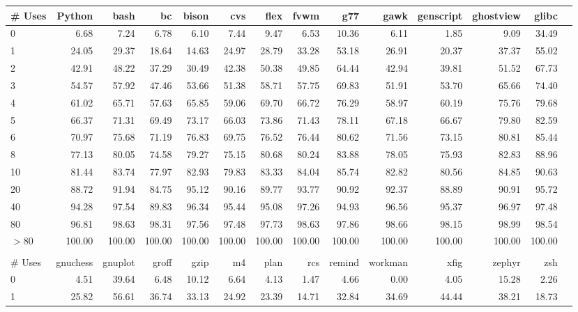 \begin{tabular}{|l|r|r|r|r|r|r|r|r|r|r|r|r|r|}\hline
\# Uses & Python & bash & bc & bison & cvs & flex & fvwm & g77 & gawk & genscript & ghostview & glibc\\\hline\hline
0 & 6.68 & 7.24 & 6.78 & 6.10 & 7.44 & 9.47 & 6.53 & 10.36 & 6.11 & 1.85 & 9.09 & 34.49\\\hline
1 & 24.05 & 29.37 & 18.64 & 14.63 & 24.97 & 28.79 & 33.28 & 53.18 & 26.91 & 20.37 & 37.37 & 55.02\\\hline
2 & 42.91 & 48.22 & 37.29 & 30.49 & 42.38 & 50.38 & 49.85 & 64.44 & 42.94 & 39.81 & 51.52 & 67.73\\\hline
3 & 54.57 & 57.92 & 47.46 & 53.66 & 51.38 & 58.71 & 57.75 & 69.83 & 51.91 & 53.70 & 65.66 & 74.40\\\hline
4 & 61.02 & 65.71 & 57.63 & 65.85 & 59.06 & 69.70 & 66.72 & 76.29 & 58.97 & 60.19 & 75.76 & 79.68\\\hline
5 & 66.37 & 71.31 & 69.49 & 73.17 & 66.03 & 73.86 & 71.43 & 78.11 & 67.18 & 66.67 & 79.80 & 82.59\\\hline
6 & 70.97 & 75.68 & 71.19 & 76.83 & 69.75 & 76.52 & 76.44 & 80.62 & 71.56 & 73.15 & 80.81 & 85.44\\\hline
8 & 77.13 & 80.05 & 74.58 & 79.27 & 75.15 & 80.68 & 80.24 & 83.88 & 78.05 & 75.93 & 82.83 & 88.96\\\hline
10 & 81.44 & 83.74 & 77.97 & 82.93 & 79.83 & 83.33 & 84.04 & 85.74 & 82.82 & 80.56 & 84.85 & 90.63\\\hline
20 & 88.72 & 91.94 & 84.75 & 95.12 & 90.16 & 89.77 & 93.77 & 90.92 & 92.37 & 88.89 & 90.91 & 95.72\\\hline
40 & 94.28 & 97.54 & 89.83 & 96.34 & 95.44 & 95.08 & 97.26 & 94.93 & 96.56 & 95.37 & 96.97 & 97.48\\\hline
80 & 96.81 & 98.63 & 98.31 & 97.56 & 97.48 & 97.73 & 98.63 & 97.86 & 98.66 & 98.15 & 98.99 & 98.54\\\hline
$>$80 & 100.00 & 100.00 & 100.00 & 100.00 & 100.00 & 100.00 & 100.00 & 100.00 & 100.00 & 100.00 & 100.00 & 100.00 \\\hline
\multicolumn{12}{c}{} \\
\hline
\# Uses & gnuchess & gnuplot & groff & gzip & m4 & plan & rcs & remind & workman & xfig & zephyr & zsh\\\hline\hline
0 & 4.51 & 39.64 & 6.48 & 10.12 & 6.64 & 4.13 & 1.47 & 4.66 & 0.00 & 4.05 & 15.28 & 2.26\\\hline
1 & 25.82 & 56.61 & 36.74 & 33.13 & 24.92 & 23.39 & 14.71 & 32.84 & 34.69 & 44.44 & 38.21 & 18.73\\\hline

\end{tabular}
